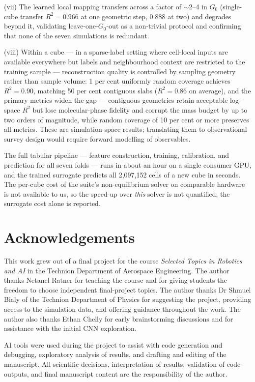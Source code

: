 \documentclass[fleqn,usenatbib]{rasti}
\newcommand{\Gzero}{G_0}
\newcommand{\Rsq}{R^2}
\begin{document}
(vii) The learned local mapping transfers across a factor of
\(\sim\)2--4 in \(\Gzero\) (single-cube transfer \(\Rsq = 0.966\) at one
geometric step, 0.888 at two) and degrades beyond it, validating
leave-one-\(\Gzero\)-out as a non-trivial protocol and confirming that
none of the seven simulations is redundant.

(viii) Within a cube --- in a sparse-label setting where cell-local
inputs are available everywhere but labels and neighbourhood context
are restricted to the training sample --- reconstruction quality is
controlled by sampling geometry rather than sample volume: 1 per cent
uniformly random
coverage achieves \(\Rsq = 0.90\), matching 50 per cent contiguous slabs
(\(\Rsq = 0.86\) on average), and the primary metrics widen the gap ---
contiguous geometries retain acceptable log-space \(\Rsq\) but lose
molecular-phase fidelity and corrupt the mass budget by up to two
orders of magnitude, while random coverage of 10 per cent or more
preserves all metrics. These are simulation-space
results;
translating them to observational survey design would require forward
modelling of observables.

The full tabular pipeline --- feature construction, training,
calibration, and prediction for all seven folds --- runs in about an
hour on a single consumer GPU, and the trained surrogate predicts all
2,097,152 cells of a new cube in seconds. The per-cube cost of the
suite's non-equilibrium solver on comparable hardware is not available
to us, so the speed-up over \emph{this} solver is not quantified; the
surrogate cost alone is reported.

\section*{Acknowledgements}
This work grew out of a final project for the course \emph{Selected Topics in Robotics and AI} in the Technion Department of Aerospace Engineering. The author thanks Netanel Ratner for teaching the course and for giving students the freedom to choose independent final-project topics. The author thanks Dr Shmuel Bialy of the Technion Department of Physics for suggesting the project, providing access to the simulation data, and offering guidance throughout the work. The author also thanks Ethan Chelly for early brainstorming discussions and for assistance with the initial CNN exploration.

AI tools were used during the project to assist with code generation and debugging, exploratory analysis of results, and drafting and editing of the manuscript. All scientific decisions, interpretation of results, validation of code outputs, and final manuscript content are the responsibility of the author.
\end{document}
